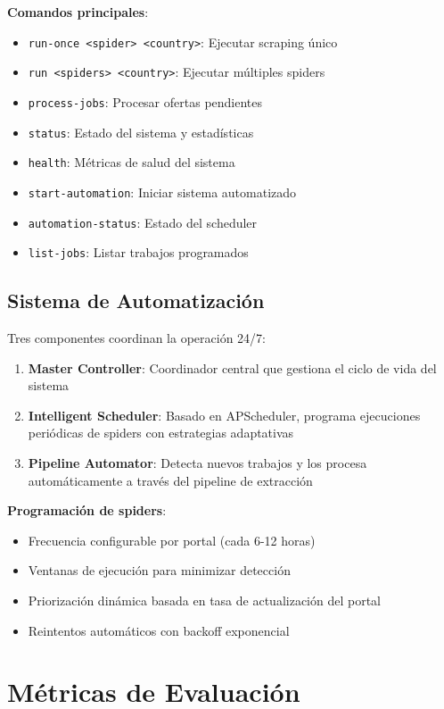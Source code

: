 \textbf{Comandos principales}:
\begin{itemize}
    \item \texttt{run-once <spider> <country>}: Ejecutar scraping único
    \item \texttt{run <spiders> <country>}: Ejecutar múltiples spiders
    \item \texttt{process-jobs}: Procesar ofertas pendientes
    \item \texttt{status}: Estado del sistema y estadísticas
    \item \texttt{health}: Métricas de salud del sistema
    \item \texttt{start-automation}: Iniciar sistema automatizado
    \item \texttt{automation-status}: Estado del scheduler
    \item \texttt{list-jobs}: Listar trabajos programados
\end{itemize}

\subsection{Sistema de Automatización}

Tres componentes coordinan la operación 24/7:

\begin{enumerate}
    \item \textbf{Master Controller}: Coordinador central que gestiona el ciclo de vida del sistema
    \item \textbf{Intelligent Scheduler}: Basado en APScheduler, programa ejecuciones periódicas de spiders con estrategias adaptativas
    \item \textbf{Pipeline Automator}: Detecta nuevos trabajos y los procesa automáticamente a través del pipeline de extracción
\end{enumerate}

\textbf{Programación de spiders}:
\begin{itemize}
    \item Frecuencia configurable por portal (cada 6-12 horas)
    \item Ventanas de ejecución para minimizar detección
    \item Priorización dinámica basada en tasa de actualización del portal
    \item Reintentos automáticos con backoff exponencial
\end{itemize}

\section{Métricas de Evaluación}

